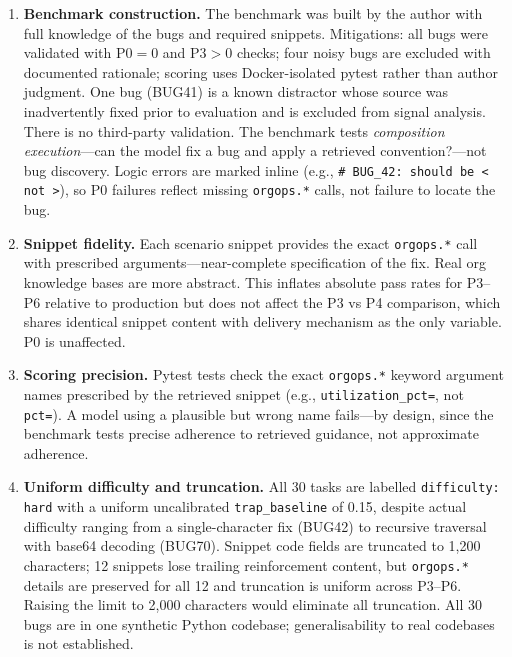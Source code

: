 \documentclass[10pt,a4paper,twocolumn]{article}
\begin{document}
\begin{enumerate}
    \item \textbf{Benchmark construction.} The benchmark was built by the
    author with full knowledge of the bugs and required snippets.
    Mitigations: all bugs were validated with P0$=$0 and P3$>$0 checks;
    four noisy bugs are excluded with documented rationale; scoring uses
    Docker-isolated pytest rather than author judgment. One bug (BUG41)
    is a known distractor whose source was inadvertently fixed prior to
    evaluation and is excluded from signal analysis. There is no
    third-party validation. The benchmark tests \emph{composition
    execution}---can the model fix a bug and apply a retrieved
    convention?---not bug discovery. Logic errors are marked inline
    (e.g., \texttt{\# BUG\_42: should be < not >}), so P0 failures
    reflect missing \texttt{orgops.*} calls, not failure to locate
    the bug.

    \item \textbf{Snippet fidelity.} Each scenario snippet provides the
    exact \texttt{orgops.*} call with prescribed arguments---near-complete
    specification of the fix. Real org knowledge bases are more abstract.
    This inflates absolute pass rates for P3--P6 relative to production
    but does not affect the P3 vs P4 comparison, which shares identical
    snippet content with delivery mechanism as the only variable. P0 is
    unaffected.

    \item \textbf{Scoring precision.} Pytest tests check the exact
    \texttt{orgops.*} keyword argument names prescribed by the retrieved
    snippet (e.g., \texttt{utilization\_pct=}, not \texttt{pct=}). A
    model using a plausible but wrong name fails---by design, since the
    benchmark tests precise adherence to retrieved guidance, not
    approximate adherence.

    \item \textbf{Uniform difficulty and truncation.} All 30 tasks are
    labelled \texttt{difficulty: hard} with a uniform uncalibrated
    \texttt{trap\_baseline} of 0.15, despite actual difficulty ranging
    from a single-character fix (BUG42) to recursive traversal with
    base64 decoding (BUG70). Snippet code fields are truncated to 1,200
    characters; 12 snippets lose trailing reinforcement content, but
    \texttt{orgops.*} details are preserved for all 12 and truncation is
    uniform across P3--P6. Raising the limit to 2,000 characters would
    eliminate all truncation. All 30 bugs are in one synthetic Python
    codebase; generalisability to real codebases is not established.


\end{enumerate}
\end{document}
